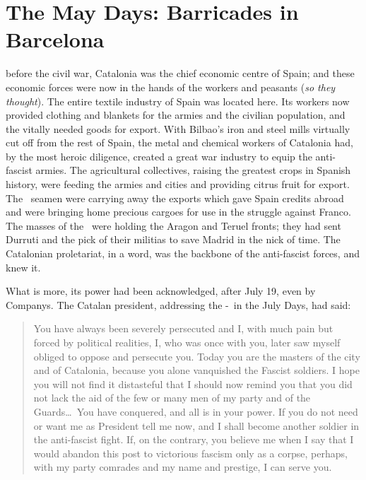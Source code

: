 \chapter[The May Days]{The May Days: Barricades in Barcelona}

 before the civil war, Catalonia was the chief economic centre of Spain; and these economic forces were now in the hands of the workers and peasants (\emph{so they thought}). The entire textile industry of Spain was located here. Its workers now provided clothing and blankets for the armies and the civilian population, and the vitally needed goods for export. With Bilbao’s iron and steel mills virtually cut off from the rest of Spain, the metal and chemical workers of Catalonia had, by the most heroic diligence, created a great war industry to equip the anti-fascist armies. The agricultural collectives, raising the greatest crops in Spanish history, were feeding the armies and cities and providing citrus fruit for export. The \CNT\ seamen were carrying away the exports which gave Spain credits abroad and were bringing home precious cargoes for use in the struggle against Franco. The masses of the \CNT\ were holding the Aragon and Teruel fronts; they had sent Durruti and the pick of their militias to save Madrid in the nick of time. The Catalonian proletariat, in a word, was the backbone of the anti-fascist forces, and knew it.

What is more, its power had been acknowledged, after July 19, even by Companys. The Catalan president, addressing the \CNT-\FAI\ in the July Days, had said:

\begin{quotation}
  You have always been severely persecuted and I, with much pain but forced by political realities, I, who was once with you, later saw myself obliged to oppose and persecute you. Today you are the masters of the city and of Catalonia, because you alone vanquished the Fascist soldiers. I hope you will not find it distasteful that I should now remind you that you did not lack the aid of the few or many men of my party and of the Guards\dots\ You have conquered, and all is in your power. If you do not need or want me as President tell me now, and I shall become another soldier in the anti-fascist fight. If, on the contrary, you believe me when I say that I would abandon this post to victorious fascism only as a corpse, perhaps, with my party comrades and my name and prestige, I can serve you.
\end{quotation}

